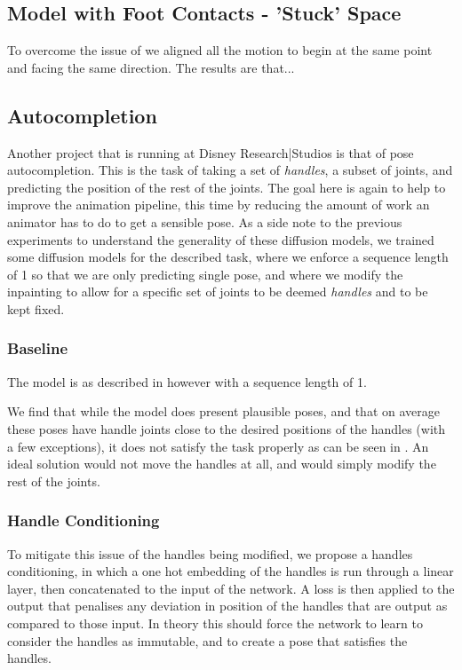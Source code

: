 \subsection{Model with Foot Contacts - 'Stuck' Space}

To overcome the issue of  we aligned all the motion to begin at the same point and facing the same direction. The results are that...

\subsection{Autocompletion}
\label{sec:autocomplete}

Another project that is running at Disney Research|Studios is that of pose autocompletion. This is the task of taking a set of \textit{handles}, a subset of joints, and predicting the position of the rest of the joints. The goal here is again to help to improve the animation pipeline, this time by reducing the amount of work an animator has to do to get a sensible pose. As a side note to the previous experiments to understand the generality of these diffusion models, we trained some diffusion models for the described task, where we enforce a sequence length of 1 so that we are only predicting  single pose, and where we modify the inpainting to allow for a specific set of joints to be deemed \textit{handles} and to be kept fixed.

\subsubsection{Baseline}
The model is as described in  however with a sequence length of 1.

We find that while the model does present plausible poses, and that on average these poses have handle joints close to the desired positions of the handles (with a few exceptions), it does not satisfy the task properly as can be seen in . An ideal solution would not move the handles at all, and would simply modify the rest of the joints.



\subsubsection{Handle Conditioning}
To mitigate this issue of the handles being modified, we propose a handles conditioning, in which a one hot embedding of the handles is run through a linear layer, then concatenated to the input of the network. A loss is then applied to the output that penalises any deviation in position of the handles that are output as compared to those input. In theory this should force the network to learn to consider the handles as immutable, and to create a pose that satisfies the handles.

